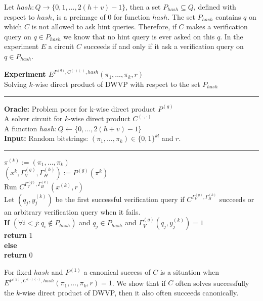 Let $hash:Q\rightarrow\{0,1,\dots, 2(h+v)-1\}$, then a set $P_{hash} \subseteq Q$,
defined with respect to $hash$, is a preimage of $0$ for function $hash$.
The set $P_{hash}$ contains $q$ on which $C$ is not allowed to ask hint queries.
Therefore, if $C$ makes a verification query on $q \in P_{hash}$ we know that no hint query is ever asked on this $q$.
In the experiment $E$ a circuit $C$ succeeds if and only if it ask a verification query on $q \in P_{hash}$.
%
\begin{codeblock}
  \textbf{Experiment $E^{P^{(g)}, C^{(.)(.)}, hash}(\pi_1, \dots, \pi_k, r)$} \\
  Solving $k$-wise direct product of DWVP with respect to the set $P_{hash}$
  \medskip

  \hrule

  \medskip
  \textbf{Oracle:} Problem poser for k-wise direct product $P^{(g)}$ \\
  \IndI A solver circuit for $k$-wise direct product $C^{(\cdot, \cdot)}$ \\
  \IndI A function $hash: Q \leftarrow \{0, \dots, 2(h+v) - 1\}$\\
  \textbf{Input:} Random bitstrings: $(\pi_1, \dots, \pi_k) \in \{0,1\}^{kl}$ and $r$.\\

  \medskip\hrule\medskip

  $\pi^{(k)} := \left(\pi_1, \dots, \pi_k \right)$\\
  $(x^{k}, \Gamma_V^{(g)}, \Gamma_H^{(k)}) := P^{(g)}(\pi^{k})$\\
  Run $C^{\Gamma_V^{(g)}, \Gamma_H^{(k)}} (x^{(k)}, r)$ \\
  \IndI Let $(q_j,y_j^{(k)})$ be the first successful verification query if $C^{\Gamma_V^{(g)}, \Gamma_H^{(k)}}$ succeeds or \\
  \IndI an arbitrary verification query when it fails.\\
  \textbf{If} $(\forall i < j :  q_i \notin P_{hash} )$ and $q_j \in P_{hash}$ and $\Gamma_V^{(g)}(q_j, y_j^{(k)}) = 1$ \\
  \IndI \textbf{return} 1\\
  \textbf{else}\\
  \IndI \textbf{return} 0\\
\end{codeblock}
%
For fixed $hash$ and $P^{(1)}$ a canonical success of $C$ is a situation when $E^{P^{(g)}, C^{(.)(.)}, hash}(\pi_1, \dots, \pi_k, r) = 1$.
We show that if $C$ often solves successfully the $k$-wise direct product of DWVP, then it also often succeeds canonically.
